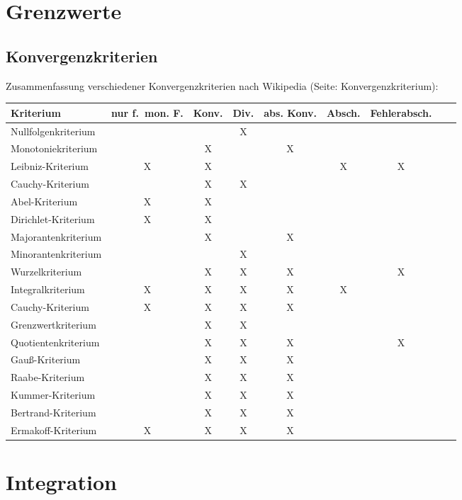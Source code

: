 \chapter{Grenzwerte}
\section{Konvergenzkriterien}
Zusammenfassung verschiedener Konvergenzkriterien nach Wikipedia (Seite: Konvergenzkriterium):
\begin{center}
    \begin{tabular}{lcccccccp{2cm}}
         \toprule
         Kriterium & {nur f.\ mon. F.} & Konv. & Div. & abs. Konv. & Absch. & Fehlerabsch.\\
         \midrule
         Nullfolgenkriterium &  &  & X &  &  & \\
         Monotoniekriterium &  & X &  & X &  & \\
         Leibniz-Kriterium & X & X &  &  & X & X\\
         Cauchy-Kriterium &  & X & X &  &  & \\
         Abel-Kriterium & X & X &  &  &  & \\
         Dirichlet-Kriterium & X & X &  &  &  & \\
         Majorantenkriterium &  & X &  & X &  & \\
         Minorantenkriterium &  &  & X &  &  & \\
         Wurzelkriterium &  & X & X & X &  & X\\
         Integralkriterium & X & X & X & X & X & \\
         Cauchy-Kriterium & X & X & X & X &  & \\
         Grenzwertkriterium &  & X & X &  &  & \\
         Quotientenkriterium &  & X & X & X &  & X\\
         Gauß-Kriterium &  & X & X & X &  & \\
         Raabe-Kriterium &  & X & X & X &  & \\
         Kummer-Kriterium &  & X & X & X &  & \\
         Bertrand-Kriterium &  & X & X & X &  & \\
         Ermakoff-Kriterium & X & X & X & X &  & \\
         \bottomrule
    \end{tabular}
\end{center}

\chapter{Integration}
